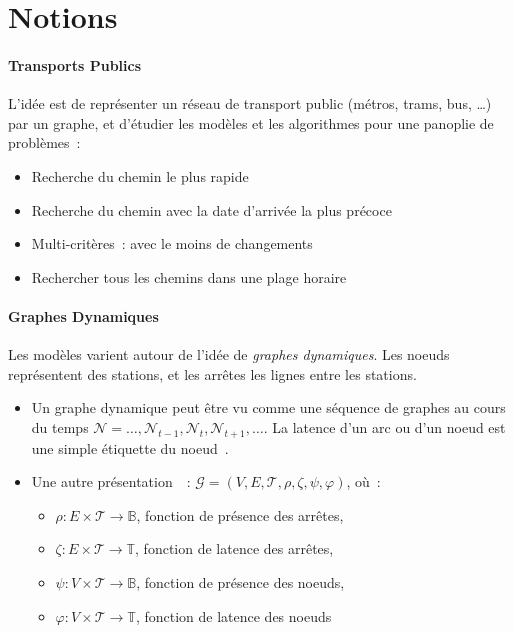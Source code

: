 \documentclass[12pt,a4paper]{article}
\begin{document}
\pagebreak

\section{Notions}

\paragraph{Transports Publics}
L'idée est de représenter un réseau de transport public (métros,
trams, bus, …) par un graphe, et d'étudier les modèles et les
algorithmes pour une panoplie de problèmes~:
\begin{itemize}
\item Recherche du chemin le plus rapide
\item Recherche du chemin avec la date d'arrivée la plus précoce
\item Multi-critères~: avec le moins de changements
\item Rechercher tous les chemins dans une plage horaire
\end{itemize}


\paragraph{Graphes Dynamiques}
Les modèles varient autour de l'idée de \textit{graphes
  dynamiques}. Les noeuds représentent des stations, et les arrêtes
les lignes entre les stations.

\begin{itemize}
\item Un graphe dynamique peut être vu comme une séquence de graphes
  au cours du temps \(\mathcal{N} = \dots, \mathcal{N}_{t-1},
  \mathcal{N}_{t}, \mathcal{N}_{t+1}, \dots\). La latence d'un arc ou
  d'un noeud est une simple étiquette du noeud~\cite{xuan2003computing}.
\item Une autre présentation~\cite{casteigts2012time}~:
  \(\mathcal{G} = (V, E, \mathcal{T}, \rho, \zeta, \psi, \varphi)\),
  où~:
  \begin{itemize}
  \item \(\rho : E \times \mathcal{T} \to \mathbb{B}\), fonction de
    présence des arrêtes,
  \item \(\zeta : E \times \mathcal{T} \to \mathbb{T}\), fonction de
    latence des arrêtes,
  \item \(\psi : V \times \mathcal{T} \to \mathbb{B}\), fonction de
    présence des noeuds,
  \item \(\varphi : V \times \mathcal{T} \to \mathbb{T}\), fonction de
    latence des noeuds
  \end{itemize}
\end{itemize}
\end{document}

